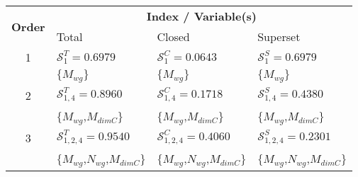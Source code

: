 
\begin{tabular}{|c|lll|}
   \hline
   \multicolumn{1}{|c|}{\multirow{2}{*}{\textbf{Order}}} & \multicolumn{3}{c|}{\textbf{Index / Variable(s)}} \\ \cline{2-4}
   \multicolumn{1}{|c|}{} & Total & Closed & Superset \\
   \hline \hline
    1 & $\mathcal{S}^T_{ 1 } = 0.6979$ & $\mathcal{S}^C_{ 1 }= 0.0643$ & $\mathcal{S}^S_{ 1 } = 0.6979$ \\ 
            & $\{$$M_{wg}$$\}$ & $\{$$M_{wg}$$\}$ & $\{$$M_{wg}$$\}$ \\ \hline

    2 & $\mathcal{S}^T_{ 1,4 } = 0.8960$ & $\mathcal{S}^C_{ 1,4 }= 0.1718$ & $\mathcal{S}^S_{ 1,4 } = 0.4380$ \\ 
            & $\{$$M_{wg}$,$M_{dimC}$$\}$ & $\{$$M_{wg}$,$M_{dimC}$$\}$ & $\{$$M_{wg}$,$M_{dimC}$$\}$ \\ \hline

    3 & $\mathcal{S}^T_{ 1,2,4 } = 0.9540$ & $\mathcal{S}^C_{ 1,2,4 }= 0.4060$ & $\mathcal{S}^S_{ 1,2,4 } = 0.2301$ \\ 
            & $\{$$M_{wg}$,$N_{wg}$,$M_{dimC}$$\}$ & $\{$$M_{wg}$,$N_{wg}$,$M_{dimC}$$\}$ & $\{$$M_{wg}$,$N_{wg}$,$M_{dimC}$$\}$ \\ \hline
    \end{tabular}